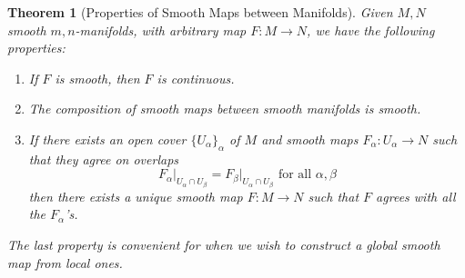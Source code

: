 \documentclass{article}
\newtheorem{theorem}{Theorem}[section]
\theoremstyle{remark}
\theoremstyle{definition}
\begin{document}
  \begin{theorem}[Properties of Smooth Maps between Manifolds]
    Given $M, N$ smooth $m, n$-manifolds, with arbitrary map $F: M \longrightarrow N$, we have the following properties: 

    \begin{enumerate}
      \item If $F$ is smooth, then $F$ is continuous. 
      \item The composition of smooth maps between smooth manifolds is smooth. 
      \item If there exists an open cover $\{U_\alpha\}_\alpha$ of $M$ and smooth maps $F_\alpha: U_\alpha \longrightarrow N$ such that they agree on overlaps
        \[F_\alpha \big|_{U_\alpha \cap U_\beta} = F_\beta \big|_{U_\alpha \cap U_\beta} \text{ for all } \alpha, \beta\]
      then there exists a unique smooth map $F: M \longrightarrow N$ such that $F$ agrees with all the $F_\alpha$'s. 
    \end{enumerate}

    The last property is convenient for when we wish to construct a global smooth map from local ones. 
  \end{theorem}
\end{document}
